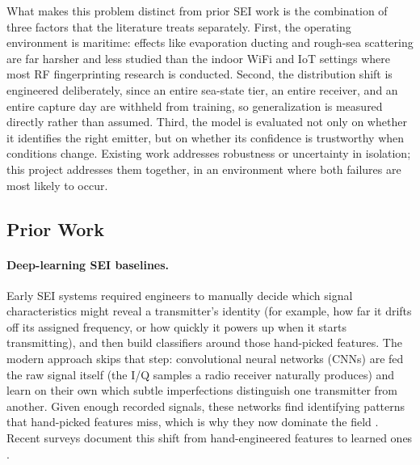 \documentclass{article}
\begin{document}
What makes this problem distinct from prior SEI work is the combination of three factors
that the literature treats separately. First, the operating environment is maritime:
effects like evaporation ducting and rough-sea scattering are far harsher and less
studied than the indoor WiFi and IoT settings where most RF fingerprinting research is
conducted. Second, the distribution shift is engineered deliberately, since an entire
sea-state tier, an entire receiver, and an entire capture day are withheld from training,
so generalization is measured directly rather than assumed. Third, the model is
evaluated not only on whether it identifies the right emitter, but on whether its
confidence is trustworthy when conditions change. Existing work addresses robustness or
uncertainty in isolation; this project addresses them together, in an environment where
both failures are most likely to occur.

\subsection{Prior Work}

\paragraph{Deep-learning SEI baselines.}
Early SEI systems required engineers to manually decide which signal characteristics
might reveal a transmitter's identity (for example, how far it drifts off its assigned
frequency, or how quickly it powers up when it starts transmitting), and then build
classifiers around those hand-picked features. The modern approach skips that step:
convolutional neural networks (CNNs) are fed the raw signal itself (the I/Q samples a
radio receiver naturally produces) and learn on their own which subtle imperfections
distinguish one transmitter from another. Given enough recorded signals, these networks
find identifying patterns that hand-picked features miss, which is why they now dominate
the field \citep{ding2018, riyaz2018, sankhe2020}. Recent surveys document this shift
from hand-engineered features to learned ones \citep{ietsurvey2022, yan2025}.
\end{document}
